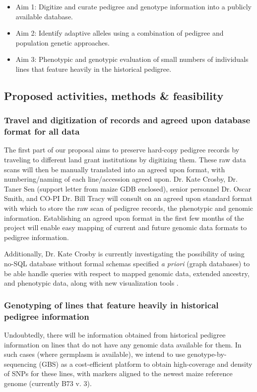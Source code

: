 \documentclass[12pt]{article}
\begin{document}
\begin{itemize}
\item Aim 1: Digitize and curate pedigree and genotype information into a publicly available database. 
\item Aim 2: Identify adaptive alleles using a combination of pedigree and population genetic approaches.
\item Aim 3: Phenotypic and genotypic evaluation of small numbers of individuals lines that feature heavily in the historical pedigree.

\end{itemize}
\subsection*{Proposed activities, methods \& feasibility}
\subsubsection*{Travel and digitization of records and agreed upon database format for all data}
The first part of our proposal aims to preserve hard-copy pedigree records by traveling to different land grant institutions by digitizing them. 
These raw data scans will then be manually translated into an agreed upon format, with numbering/naming of each line/accession agreed upon.
Dr. Kate Crosby, Dr. Taner Sen (support letter from maize GDB enclosed), senior personnel Dr. Oscar Smith, and CO-PI Dr. Bill Tracy will consult on an agreed upon standard format with which to store the raw scan of pedigree records, the phenotypic and genomic information. 
Establishing an agreed upon format in the first few months of the project will enable easy mapping of current and future genomic data formats to pedigree information.
\par Additionally, Dr. Kate Crosby is currently investigating the possibility of using no-SQL database without formal schemas specified \textit{a priori} (graph databases) to be able handle queries with respect to mapped genomic data, extended ancestry, and phenotypic data, along with new visualization tools \citep{ParejaTobes:2015bf}.

\subsubsection*{Genotyping of lines that feature heavily in historical pedigree information}
Undoubtedly, there will be information obtained from historical pedigree information on lines that do not have any genomic data available for them. 
In such cases (where germplasm is available), we intend to use genotype-by-sequencing (GBS) \citep{Elshire:2011ha} as a cost-efficient platform \citep{Glaubitz:2014eu} to obtain high-coverage and density of SNPs  for these lines, with markers aligned to the newest maize reference genome (currently B73 v. 3). 
\end{document}
